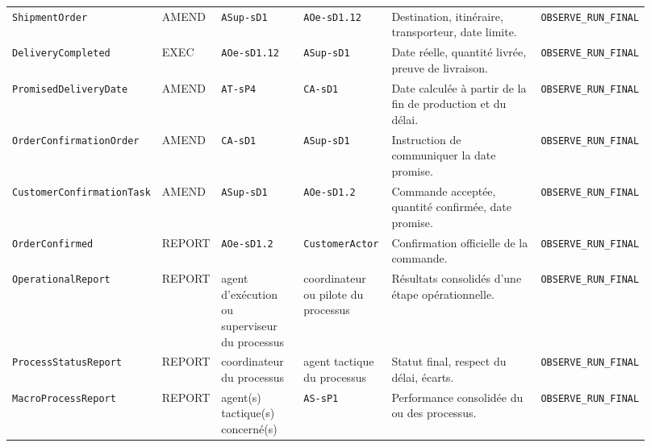 \begin{landscape}
{\begin{longtable}{L{0.15\linewidth} L{0.06\linewidth} L{0.14\linewidth} L{0.14\linewidth} L{0.32\linewidth} L{0.11\linewidth}}
\texttt{Shipment\allowbreak Order} & AMEND & \texttt{ASup-s\allowbreak D1} & \texttt{AOe-s\allowbreak D1.12} & Destination, itinéraire, transporteur, date limite. & \texttt{OBSERVE\_\allowbreak RUN\_\allowbreak FINAL} \\
\texttt{Delivery\allowbreak Completed} & EXEC & \texttt{AOe-s\allowbreak D1.12} & \texttt{ASup-s\allowbreak D1} & Date réelle, quantité livrée, preuve de livraison. & \texttt{OBSERVE\_\allowbreak RUN\_\allowbreak FINAL} \\
\texttt{Promised\allowbreak Delivery\allowbreak Date} & AMEND & \texttt{AT-s\allowbreak P4} & \texttt{CA-s\allowbreak D1} & Date calculée à partir de la fin de production et du délai. & \texttt{OBSERVE\_\allowbreak RUN\_\allowbreak FINAL} \\
\texttt{Order\allowbreak Confirmation\allowbreak Order} & AMEND & \texttt{CA-s\allowbreak D1} & \texttt{ASup-s\allowbreak D1} & Instruction de communiquer la date promise. & \texttt{OBSERVE\_\allowbreak RUN\_\allowbreak FINAL} \\
\texttt{Customer\allowbreak Confirmation\allowbreak Task} & AMEND & \texttt{ASup-s\allowbreak D1} & \texttt{AOe-s\allowbreak D1.2} & Commande acceptée, quantité confirmée, date promise. & \texttt{OBSERVE\_\allowbreak RUN\_\allowbreak FINAL} \\
\texttt{Order\allowbreak Confirmed} & REPORT & \texttt{AOe-s\allowbreak D1.2} & \texttt{Customer\allowbreak Actor} & Confirmation officielle de la commande. & \texttt{OBSERVE\_\allowbreak RUN\_\allowbreak FINAL} \\
\texttt{Operational\allowbreak Report} & REPORT & agent d'exécution ou superviseur du processus & coordinateur ou pilote du processus & Résultats consolidés d'une étape opérationnelle. & \texttt{OBSERVE\_\allowbreak RUN\_\allowbreak FINAL} \\
\texttt{Process\allowbreak Status\allowbreak Report} & REPORT & coordinateur du processus & agent tactique du processus & Statut final, respect du délai, écarts. & \texttt{OBSERVE\_\allowbreak RUN\_\allowbreak FINAL} \\
\texttt{Macro\allowbreak Process\allowbreak Report} & REPORT & agent(s) tactique(s) concerné(s) & \texttt{AS-s\allowbreak P1} & Performance consolidée du ou des processus. & \texttt{OBSERVE\_\allowbreak RUN\_\allowbreak FINAL} \\


\end{longtable}}
\end{landscape}
